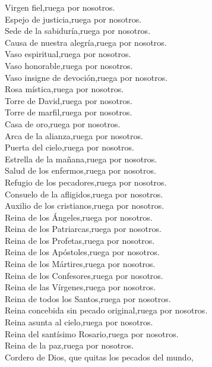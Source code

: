 Virgen fiel,{\hfill}ruega por nosotros.\\
Espejo de justicia,{\hfill}ruega por nosotros.\\
Sede de la sabiduría,{\hfill}ruega por nosotros.\\
Causa de nuestra alegría,{\hfill}ruega por nosotros.\\
Vaso espiritual,{\hfill}ruega por nosotros.\\
Vaso honorable,{\hfill}ruega por nosotros.\\
Vaso insigne de devoción,{\hfill}ruega por nosotros.\\
Rosa mística,{\hfill}ruega por nosotros.\\
Torre de David,{\hfill}ruega por nosotros.\\
Torre de marfil,{\hfill}ruega por nosotros.\\
Casa de oro,{\hfill}ruega por nosotros.\\
Arca de la alianza,{\hfill}ruega por nosotros.\\
Puerta del cielo,{\hfill}ruega por nosotros.\\
Estrella de la mañana,{\hfill}ruega por nosotros.\\
Salud de los enfermos,{\hfill}ruega por nosotros.\\
Refugio de los pecadores,{\hfill}ruega por nosotros.\\
Consuelo de la afligidos,{\hfill}ruega por nosotros.\\
Auxilio de los cristianos,{\hfill}ruega por nosotros.\\
Reina de los Ángeles,{\hfill}ruega por nosotros.\\
Reina de los Patriarcas,{\hfill}ruega por nosotros.\\
Reina de los Profetas,{\hfill}ruega por nosotros.\\
Reina de los Apóstoles,{\hfill}ruega por nosotros.\\
Reina de los Mártires,{\hfill}ruega por nosotros.\\
Reina de los Confesores,{\hfill}ruega por nosotros.\\
Reina de las Vírgenes,{\hfill}ruega por nosotros.\\
Reina de todos los Santos,{\hfill}ruega por nosotros.\\
Reina concebida sin pecado original,{\hfill}ruega por nosotros.\\
Reina asunta al cielo,{\hfill}ruega por nosotros.\\
Reina del santísimo Rosario,{\hfill}ruega por nosotros.\\
Reina de la paz,{\hfill}ruega por nosotros.\\
Cordero de Dios, que quitas los pecados del mundo,

